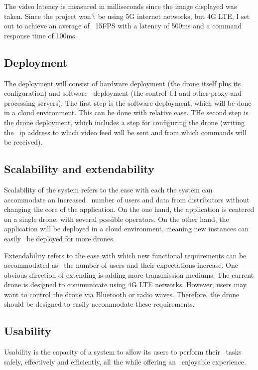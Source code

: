 The video latency is measured in milliseconds since the image displayed was taken.
Since the project won't be using 5G internet networks, but 4G LTE, I set out to achieve an average of \
15FPS with a latency of 500ms and a command response time of 100ms.

\subsection{Deployment}
\label{subsec:deployment}
The deployment will consist of hardware deployment (the drone itself plus its configuration) and software \
deployment (the control UI and other proxy and processing servers).
The first step is the software deployment, which will be done in a cloud environment.
This can be done with relative ease.
THe second step is the drone deployment, which includes a step for configuring the drone (writing the \
ip address to which video feed will be sent and from which commands will be received).

\subsection{Scalability and extendability}
\label{subsec:specification-scalability}
Scalability of the system refers to the ease with each the system can accommodate an increased \
number of users and data from distributors without changing the core of the application.
On the one hand, the  application is centered on a single drone, with several possible operators.
On the other hand, the application will be deployed in a cloud environment, meaning new instances can easily \
be deployed for more drones.

Extendability refers to the ease with which new functional requirements can be accommodated as \
the number of users and their expectations increase.
One obvious direction of extending is adding more transmission mediums.
The current drone is designed to communicate using 4G LTE networks.
However, users may want to control the drone via Bluetooth or radio waves.
Therefore, the drone should be designed to easily accommodate these requirements.

\subsection{Usability}
\label{subsec:specification-usability}
Usability is the capacity of a system to allow its users to perform their \
tasks safely, effectively and efficiently, all the while offering an \
enjoyable experience.


